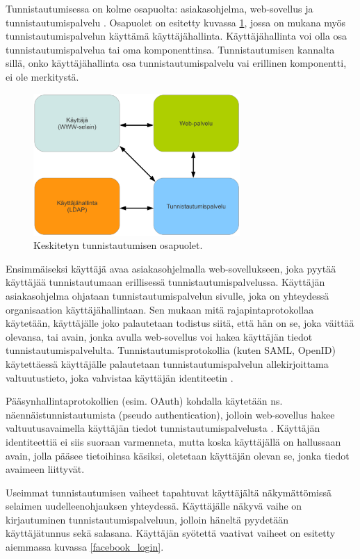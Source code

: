 Tunnistautumisessa on kolme osapuolta: asiakasohjelma, web-sovellus ja tunnistautumispalvelu \cite{nisti}. Osapuolet on esitetty kuvassa \ref{composition}, jossa on mukana myös tunnistautumispalvelun käyttämä käyttäjähallinta. Käyttäjähallinta voi olla osa tunnistautumispalvelua tai oma komponenttinsa. Tunnistautumisen kannalta sillä, onko käyttäjähallinta osa tunnistautumispalvelu vai erillinen komponentti, ei ole merkitystä.

\begin{figure}[!b]
\centering
\includegraphics[width=0.7\textwidth]{teknologiat/composition.eps}
\caption{Keskitetyn tunnistautumisen osapuolet.}%
\label{composition}
\end{figure}

Ensimmäiseksi käyttäjä avaa asiakasohjelmalla web-sovellukseen, joka pyytää käyttäjää tunnistautumaan erillisessä tunnistautumispalvelussa. Käyttäjän asiakasohjelma ohjataan tunnistautumispalvelun sivulle, joka on yhteydessä organisaation käyttäjähallintaan. Sen mukaan mitä rajapintaprotokollaa käytetään, käyttäjälle joko palautetaan todistus siitä, että hän on se, joka väittää olevansa, tai avain, jonka avulla web-sovellus voi hakea käyttäjän tiedot tunnistautumispalvelulta. Tunnistautumisprotokollia (kuten SAML, OpenID) käytettäessä käyttäjälle palautetaan tunnistautumispalvelun allekirjoittama valtuutustieto, joka vahvistaa käyttäjän identiteetin \cite{nisti}.

Pääsynhallintaprotokollien (esim. OAuth) kohdalla käytetään ns. näennäistunnistautumista (pseudo authentication), jolloin web-sovellus hakee valtuutusavaimella käyttäjän tiedot tunnistautumispalvelusta \cite{distributed_web_security}. Käyttäjän identiteettiä ei siis suoraan varmenneta, mutta koska käyttäjällä on hallussaan avain, jolla pääsee tietoihinsa käsiksi, oletetaan käyttäjän olevan se, jonka tiedot avaimeen liittyvät.

Useimmat tunnistautumisen vaiheet tapahtuvat käyttäjältä näkymättömissä selaimen uudelleenohjauksen yhteydessä. Käyttäjälle näkyvä vaihe on kirjautuminen tunnistautumispalveluun, jolloin häneltä pyydetään käyttäjätunnus sekä salasana. Käyttäjän syötettä vaativat vaiheet on esitetty aiemmassa kuvassa \ref{facebook_login}.